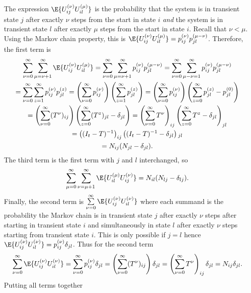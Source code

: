 \documentclass[12pt]{article}
\begin{document}
The expression \( \E{U_{ij}^{(\nu)} U_{il}^{(\mu)}} \) is the
probability that the system is in transient state \( j \) after exactly \(
\nu \) steps from the start in state \( i \) \emph{and} the system is in
transient state \( l \) after exactly \( \mu \) steps from the start in
state \( i \).  Recall that \( \nu < \mu \).  Using the Markov chain
property, this is \( \E{U_{ij}^{(\nu)} U_{il}^{(\mu)}} = p_{ij}^{(\nu)}
p_{jl}^ {(\mu-\nu)} \).  Therefore, the first term is
\begin{multline*}
    \sum\limits_{\nu=0}^{\infty} \sum\limits_{\mu=\nu+1}^{\infty} \E{U_{ij}^
    {(\nu)} U_{il}^{(\mu)}} = \sum\limits_{\nu=0}^{\infty} \sum\limits_{\mu=\nu+1}^
    {\infty} p_{ij}^{(\nu)} p_{jl}^{(\mu-\nu)} = \sum\limits_{\nu=0}^{\infty}
    \sum\limits_ {\mu-\nu=1}^{\infty} p_{ij}^{(\nu)} p_{jl}^{(\mu-\nu)}
    \\
    = \sum\limits_{\nu=0}^{\infty} \sum\limits_{z=1}^{\infty} p_{ij}^{(\nu)}
    p_{jl}^{(z)} = \left( \sum\limits_{\nu=0}^{\infty} p_{ij}^ {(\nu)}
    \right) \left( \sum\limits_{z=1}^{\infty} p_{jl}^{(z)} \right) =
    \left( \sum\limits_{\nu=0}^{\infty} p_{ij}^{(\nu)} \right) \left(
    \sum\limits_ {z=0}^{\infty} p_{jl}^{(z)} - p_{jl}^{(0)}\right) \\
    = \left( \sum\limits_{\nu=0}^{\infty} (T^\nu){}_{ij} \right) \left(
    \sum\limits_ {z=0}^{\infty} (T^z){}_{jl} - \delta_{jl}\right) =
    \left( \sum\limits_ {\nu=0}^{\infty} T^\nu \right)_{ij} \left( \sum\limits_
    {z=0}^{\infty} T^z - \delta_{jl} \right)_{jl}\\
    = \left( (I_t-T)^{-1} \right)_{ij} \left( (I_t-T)^{-1} - \delta_{jl}
    \right){}_{jl}\\
    = N_{ij}(N_{jl}-\delta_{jl}).
\end{multline*}
The third term is the first term with \( j \) and \( l \) interchanged,
so
\[
    \sum\limits_{\mu=0}^{\infty} \sum\limits_{\nu=\mu+1}^{\infty} \E{U_{il}^
    {(\mu)} U_{ij}^{(\nu)}} = N_{il}(N_{lj}-\delta_{lj}).
\] Finally, the second term is \( \sum\limits_{\nu=0}^{\infty} \E{U_{ij}^
{%
(\nu)} U_{il}^{(\nu)}} \) where each summand is the probability the
Markov chain is in transient state \( j \) after exactly \( \nu \) steps
after starting in transient state \( i \) and simultaneously in state \(
l \) after exactly \( \nu \) steps starting from transient state \( i \).
This is only possible if \( j=l \) hence \( \E{U_{ij}^{(\nu)} U_{il}^{(\nu)}}
= p_{ij}^{(\nu)} \delta_{jl} \).  Thus for the second term
\[
    \sum\limits_{\nu=0}^{\infty} \E{U_{ij}^{(\nu)} U_{il}^{(\nu)}} =
    \sum\limits_ {\nu=0}^ {\infty} p_{ij}^{(\nu)} \delta_{jl} = \left(
    \sum\limits_{\nu=0}^ {\infty} (T^ {\nu}){}_{ij} \right) \delta_{jl}
    = \left( \sum\limits_{\nu=0}^ {\infty} T^{\nu} \right)_{ij} \delta_{jl}
    = N_{ij} \delta_{jl}.
\] Putting all terms together
\end{document}

